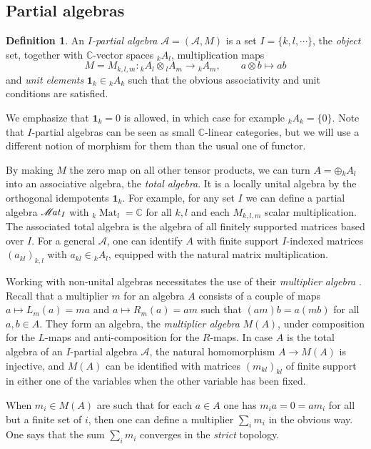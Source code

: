 \documentclass[10pt]{article}
\DeclareMathOperator{\Mat}{\mathscr{M}\!\it{at}}
\DeclareMathOperator{\Matt}{\mathrm{Mat}}
\newcommand{\C}{\mathbb{C}}
\newcommand{\GrDA}[3]{{}_{#2}#1_{#3}} %
\newcommand{\Unit}{\mathbf{1}}
\theoremstyle{definition}
\newtheorem{Def}[Theorem]{Definition}
\numberwithin{equation}{section}
\begin{document}
\subsection{Partial algebras}

\begin{Def} An \emph{$I$-partial algebra} $\mathscr{A}=(\mathscr{A},M)$ is a set $I=\{k,l,\cdots\}$, the \emph{object} set, together with $\C$-vector spaces $\GrDA{A}{k}{l}$, multiplication maps \[M=M_{k,l,m}:\GrDA{A}{k}{l} \otimes \GrDA{A}{l}{m}\rightarrow \GrDA{A}{k}{m},\qquad a\otimes b \mapsto ab\]  and \emph{unit elements} $\Unit_k \in \GrDA{A}{k}{k}$ such that the obvious associativity and unit conditions are satisfied. 
\end{Def}

We emphasize that $\Unit_k=0$ is allowed, in which case for example $\GrDA{A}{k}{k}=\{0\}$. Note that $I$-partial algebras can be seen as small $\C$-linear categories, but we will use a different notion of morphism for them than the usual one of functor.

By making $M$ the zero map on all other tensor products, we can turn $A =  \oplus\GrDA{A}{k}{l}$ into an associative algebra, the \emph{total algebra}.  It is a locally unital algebra by the orthogonal idempotents $\mathbf{1}_k$. For example, for any set $I$ we can define a partial algebra $\Mat_I$ with $\GrDA{\Matt}{k}{l} = \C$ for all $k,l$ and each $M_{k,l,m}$ scalar multiplication. The associated total algebra is the algebra of all finitely supported matrices based over $I$. For a general $\mathscr{A}$, one can identify $A$ with finite support $I$-indexed matrices $(a_{kl})_{k,l}$ with $a_{kl} \in \GrDA{A}{k}{l}$, equipped with the natural matrix multiplication. 

Working with non-unital algebras necessitates the use of their \emph{multiplier algebra} \cite{Dau1,VDae1}. Recall that a multiplier $m$ for an algebra $A$ consists of a couple of maps $a \mapsto L_m(a)=ma$ and $a\mapsto R_m(a)=am$ such that $(am)b = a(mb)$ for all $a,b\in A$. They form an algebra, the \emph{multiplier algebra} $M(A)$, under composition for the $L$-maps and anti-composition for the $R$-maps. In case $A$ is the total algebra of an $I$-partial algebra $\mathscr{A}$, the natural homomorphism $A\rightarrow M(A)$ is injective, and $M(A)$ can be identified with matrices $(m_{kl})_{kl}$ of finite support in either one of the variables when the other variable has been fixed. 

When $m_i\in M(A)$ are such that for each $a\in A$ one has $m_ia =0=am_i$ for all but a finite set of $i$, then one can define a multiplier $\sum_i m_i$ in the obvious way. One says that the sum $\sum_i m_i$ converges in the \emph{strict} topology. 
 
\end{document}
